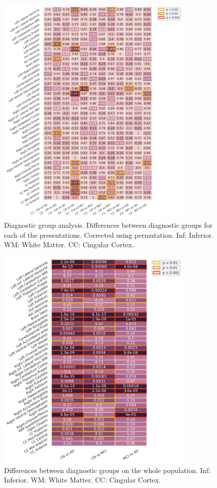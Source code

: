 \begin{figure}[!htbp]
\centering
\includegraphics[width=0.85\textwidth]{figures/cimlr/intraclustergroups.png}
\caption[Diagnostic group analysis.]{Diagnostic group analysis. Differences between diagnostic groups for each of the presentations. Corrected using permutation. Inf: Inferior. WM: White Matter. CC: Cingular Cortex.}
\label{dx_subgroups}
\end{figure}

\begin{figure}[!htbp]
\centering
\includegraphics[width=0.85\textwidth]{figures/cimlr/betweengroups_wholepop.png}
\caption[Diagnostic group analysis, whole population.]{Differences between diagnostic groups on the whole population. Inf: Inferior. WM: White Matter. CC: Cingular Cortex.}
\label{dx_wholepop}
\end{figure}

